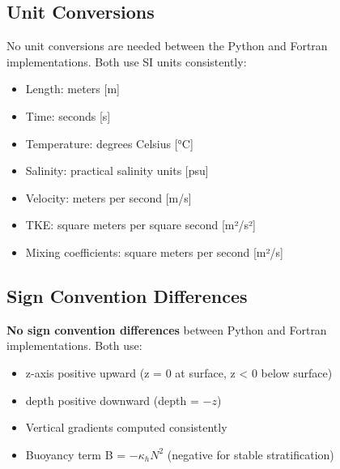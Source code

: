 \documentclass[11pt]{article}
\begin{document}
\subsection{Unit Conversions}

No unit conversions are needed between the Python and Fortran implementations. Both use SI units consistently:
\begin{itemize}
    \item Length: meters [m]
    \item Time: seconds [s]
    \item Temperature: degrees Celsius [°C]
    \item Salinity: practical salinity units [psu]
    \item Velocity: meters per second [m/s]
    \item TKE: square meters per square second [m²/s²]
    \item Mixing coefficients: square meters per second [m²/s]
\end{itemize}

\subsection{Sign Convention Differences}

\textbf{No sign convention differences} between Python and Fortran implementations. Both use:
\begin{itemize}
    \item z-axis positive upward (z = 0 at surface, z < 0 below surface)
    \item depth positive downward (depth = $-z$)
    \item Vertical gradients computed consistently
    \item Buoyancy term B = $-\kappa_h N^2$ (negative for stable stratification)
\end{itemize}
\end{document}
